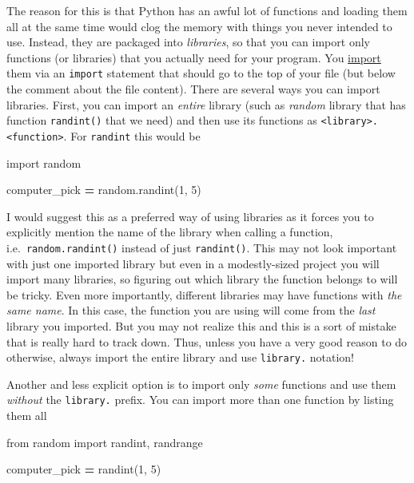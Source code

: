 \documentclass[
]{book}
\newenvironment{Shaded}{\begin{snugshade}}{\end{snugshade}}
\newcommand{\DecValTok}[1]{\textcolor[rgb]{0.00,0.00,0.81}{#1}}
\newcommand{\ImportTok}[1]{#1}
\newcommand{\NormalTok}[1]{#1}
\newcommand{\OperatorTok}[1]{\textcolor[rgb]{0.81,0.36,0.00}{\textbf{#1}}}
\begin{document}
The reason for this is that Python has an awful lot of functions and loading them all at the same time would clog the memory with things you never intended to use. Instead, they are packaged into \emph{libraries}, so that you can import only functions (or libraries) that you actually need for your program. You \href{https://docs.python.org/3/reference/import.html}{import} them via an \texttt{import} statement that should go to the top of your file (but below the comment about the file content). There are several ways you can import libraries. First, you can import an \emph{entire} library (such as \emph{random} library that has function \texttt{randint()} that we need) and then use its functions as \texttt{\textless{}library\textgreater{}.\textless{}function\textgreater{}}. For \texttt{randint} this would be

\begin{Shaded}
\begin{Highlighting}[]
\ImportTok{import}\NormalTok{ random}

\NormalTok{computer\_pick }\OperatorTok{=}\NormalTok{ random.randint(}\DecValTok{1}\NormalTok{, }\DecValTok{5}\NormalTok{)}
\end{Highlighting}
\end{Shaded}

I would suggest this as a preferred way of using libraries as it forces you to explicitly mention the name of the library when calling a function, i.e.~\texttt{random.randint()} instead of just \texttt{randint()}. This may not look important with just one imported library but even in a modestly-sized project you will import many libraries, so figuring out which library the function belongs to will be tricky. Even more importantly, different libraries may have functions with \emph{the same name}. In this case, the function you are using will come from the \emph{last} library you imported. But you may not realize this and this is a sort of mistake that is really hard to track down. Thus, unless you have a very good reason to do otherwise, always import the entire library and use \texttt{library.} notation!

Another and less explicit option is to import only \emph{some} functions and use them \emph{without} the \texttt{library.} prefix. You can import more than one function by listing them all

\begin{Shaded}
\begin{Highlighting}[]
\ImportTok{from}\NormalTok{ random }\ImportTok{import}\NormalTok{ randint, randrange}

\NormalTok{computer\_pick }\OperatorTok{=}\NormalTok{ randint(}\DecValTok{1}\NormalTok{, }\DecValTok{5}\NormalTok{)}
\end{Highlighting}
\end{Shaded}
\end{document}
